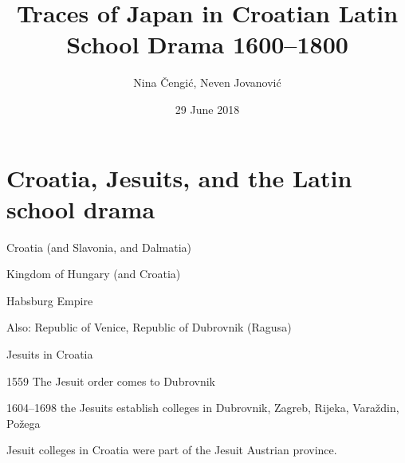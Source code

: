 \documentclass[14pt]{beamer}
\title{Traces of Japan in Croatian Latin School Drama 1600–1800}
\date{29 June 2018}
\author{Nina Čengić, Neven Jovanović}
\institute{University of Zagreb, Faculty of Humanities and Social Sciences}
\begin{document}
  \maketitle
  


\begin{frame}
\tableofcontents
\end{frame}

\section{Croatia, Jesuits, and the Latin school drama}

{
    \begin{frame}[plain]
    \end{frame}
    }


\begin{frame}

Croatia (and Slavonia, and Dalmatia)

Kingdom of Hungary (and Croatia)

Habsburg Empire

Also: Republic of Venice, Republic of Dubrovnik (Ragusa)

\end{frame}


\begin{frame}{Jesuits in Croatia}

\alert{1559} The Jesuit order comes to Dubrovnik

\alert{1604–1698} the Jesuits establish colleges in Dubrovnik, Zagreb, Rijeka, Varaždin, Požega

Jesuit colleges in Croatia were part of the Jesuit Austrian province.

\end{frame}
\end{document}
